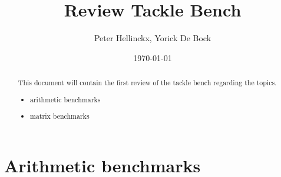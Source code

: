 \documentclass[a4paper]{article}
\title{Review Tackle Bench}
\author{Peter Hellinckx, Yorick De Bock}
\date{\today}
\begin{document}
\maketitle

\begin{abstract}
This document will contain the first review of the tackle bench regarding the topics.
\begin{itemize}
\item arithmetic benchmarks
\item matrix benchmarks    
\end{itemize}

\end{abstract}

\section{Arithmetic benchmarks}
\end{document}

